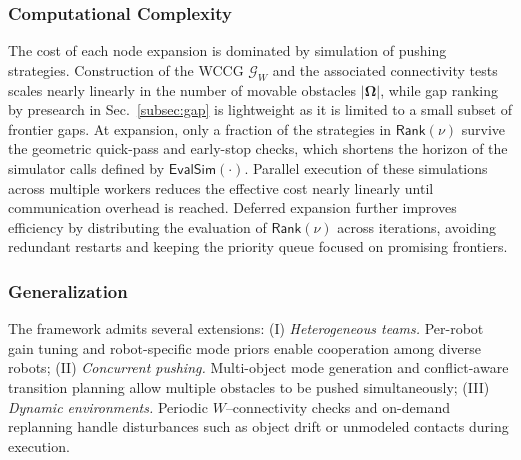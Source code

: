 \subsubsection{Computational Complexity}\label{subsubsec:complexity}
The cost of each node expansion is dominated by simulation of pushing strategies. 
Construction of the WCCG $\mathcal{G}_W$ and the associated connectivity tests scales nearly linearly 
in the number of movable
obstacles $|\boldsymbol{\Omega}|$, while gap ranking by presearch
in Sec.~\ref{subsec:gap} is lightweight as it is limited to a small subset
of frontier gaps. At expansion, only a fraction of the strategies in
$\mathsf{Rank}(\nu)$ survive the geometric quick-pass and early-stop checks,
which shortens the horizon of the simulator calls defined by
$\mathsf{EvalSim}(\cdot)$. Parallel execution of these simulations across multiple
workers reduces the effective cost nearly linearly until communication overhead
is reached. Deferred expansion further improves efficiency by distributing the
evaluation of $\mathsf{Rank}(\nu)$ across iterations, avoiding redundant
restarts and keeping the priority queue focused on promising frontiers.


\subsubsection{Generalization}\label{subsec:general}
The framework admits several extensions: 
(I) \textit{Heterogeneous teams.} Per-robot gain tuning and robot-specific mode 
priors enable cooperation among diverse robots; 
(II) \textit{Concurrent pushing.} Multi-object mode generation and conflict-aware 
transition planning allow multiple obstacles to be pushed simultaneously; 
(III) \textit{Dynamic environments.} Periodic $W$--connectivity checks and 
on-demand replanning handle disturbances such as object drift or unmodeled 
contacts during execution.

